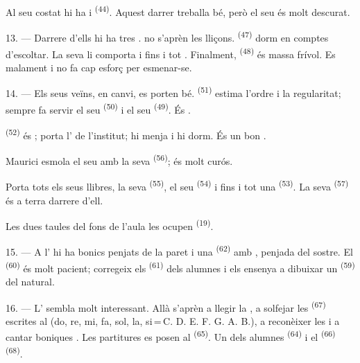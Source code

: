 Al seu costat hi ha  i  \textsuperscript{(44)}.
Aquest darrer treballa bé, però el seu  és molt descurat.

13. --- Darrere d'ells hi ha tres .  no s'aprèn
les lliçons.  \textsuperscript{(47)} dorm en comptes d'escoltar.
La seva  li comporta  i fins i tot
. Finalment,  \textsuperscript{(48)} és massa
frívol. Es  malament i no fa cap esforç per esmenar-se.

14. --- Els seus veïns, en canvi, es porten bé. 
\textsuperscript{(51)} estima l'ordre i la regularitat; sempre fa servir el seu
 \textsuperscript{(50)} i el seu 
\textsuperscript{(49)}. És .

 \textsuperscript{(52)} és ; porta l'
de l'institut; hi menja i hi dorm. És un bon .

Maurici esmola el seu  amb la seva 
\textsuperscript{(56)}; és molt curós.

Porta tots els seus llibres, la seva  \textsuperscript{(55)},
el seu  \textsuperscript{(54)} i fins i tot una
 \textsuperscript{(53)}. La seva  \textsuperscript{(57)} és a terra darrere d'ell.

Les dues taules del fons de l'aula les ocupen 
\textsuperscript{(19)}.

\VUsaut{4.6mm}
\VUsaut{3.4mm}

15. --- A l' hi ha bonics  penjats de la
paret i una  \textsuperscript{(62)} amb ,
penjada del sostre. El  \textsuperscript{(60)} és molt
pacient; corregeix els  \textsuperscript{(61)} dels alumnes i
els ensenya a dibuixar un  \textsuperscript{(59)} del natural.

16. --- L' sembla molt interessant. Allà s'aprèn a llegir
la , a solfejar les 
\textsuperscript{(67)} escrites al  (do, re, mi, fa, sol, la,
si\,=\,C. D. E. F. G. A. B.), a reconèixer les  i a cantar boniques
. Les partitures es posen al 
\textsuperscript{(65)}. Un dels alumnes 
\textsuperscript{(64)} i el  \textsuperscript{(66)}
 \textsuperscript{(68)}.


